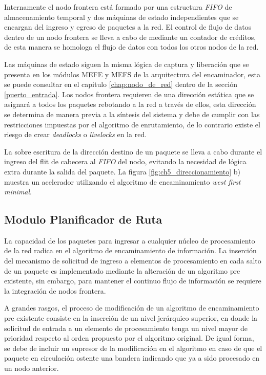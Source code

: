 Internamente el nodo frontera está formado por una estructura \textit{FIFO} de almacenamiento temporal y dos máquinas de estado independientes que se encargan del ingreso y egreso de paquetes a la red. El control de flujo de datos dentro de un nodo frontera se lleva a cabo de mediante un contador de créditos, de esta manera se homologa el flujo de datos con todos los otros nodos de la red.

Las máquinas de estado siguen la misma lógica de captura y liberación que se presenta en los módulos MEFE y MEFS de la arquitectura del encaminador, esta se puede consultar en el capitulo \ref{chap:nodo_de_red} dentro de la sección \ref{puerto_entrada}. Los nodos frontera requieren de una dirección estática que se asignará a todos los paquetes rebotando a la red a través de ellos, esta dirección se determina de manera previa a la síntesis del sistema y debe de cumplir con las restricciones impuestas por el algoritmo de enrutamiento, de lo contrario existe el riesgo de crear \textit{deadlocks} o \textit{livelocks} en la red.

La sobre escritura de la dirección destino de un paquete se lleva a cabo durante el ingreso del flit de cabecera al \textit{FIFO} del nodo, evitando la necesidad de lógica extra durante la salida del paquete. La figura \ref{fig:ch5_direccionamiento} b) muestra un acelerador utilizando el algoritmo de encaminamiento \textit{west first minimal}. 


\subsection{Modulo Planificador de Ruta}
	\label{subsec:ch5_modulo_planificador_de_ruta}

La capacidad de los paquetes para ingresar a cualquier núcleo de procesamiento de la red radica en el algoritmo de encaminamiento de información. La inserción del mecanismo de solicitud de ingreso a elementos de procesamiento en cada salto de un paquete es implementado mediante la alteración de un algoritmo pre existente, sin embargo, para mantener el continuo flujo de información se requiere la integración de nodos frontera.

A grandes rasgos, el proceso de modificación de un algoritmo de encaminamiento pre existente consiste en la inserción de un nivel jerárquico superior, en donde la solicitud de entrada a un elemento de procesamiento tenga un nivel mayor de prioridad respecto al orden propuesto por el algoritmo original. De igual forma, se debe de incluir un supresor de la modificación en el algoritmo en caso de que el paquete en circulación ostente una bandera indicando que ya a sido procesado en un nodo anterior.

